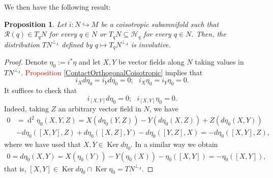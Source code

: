 \documentclass[12pt]{article}
\newtheorem{prop}{Proposition}[section]
\renewcommand{\ker}{\operatorname{Ker}}
\renewcommand{\d}{\operatorname{d}}
\begin{document}
We then have the following result:\\
\begin{prop} Let $i: N \hookrightarrow M$ be a coisotropic subamnifold such that $\mathcal{R}(q) \in T_qN$ for every $q \in N$ or $T_qN \subseteq \mathcal{H}_q$ for every $q \in N$. Then, the distribution $TN^{\perp_\Lambda}$ defined by $q \mapsto T_qN^{\perp_\Lambda}$ is involutive.
 \end{prop}
\begin{proof} Denote $\eta_0:= i^*\eta$ and let $X, Y$ be vector fields along $N$ taking values in $TN^{\perp_\Lambda}$. \textcolor{red}{Proposition \ref{ContactOrthogonalCoisotropic}} implies that $$i_X  d\eta_0 = i_Y d\eta_0 = 0;\,\,\,\, i_X \eta_0 = i_Y \eta_0 = 0.$$
It suffices to check that $$i_{[X,Y]} d\eta_0 = 0;\,\,\,\, i_{[X,Y]}\eta_0 =0.$$ Indeed, taking $Z$ an arbitrary vector field in $N$, we have
\begin{align*}
0 &= \d^2\eta_0(X,Y,Z) =  X( d\eta_0(Y,Z)) - Y( d\eta_0(X,Z)) + Z( d\eta_0(X,Y))\\
&-  d\eta_0([X,Y],Z) +  d\eta_0([X,Z],Y) - d\eta_0([Y,Z], X) = -d\eta_0([X,Y],Z),
\end{align*}
where we have used that $X,Y \in \ker d \eta_0.$ In a similar way we obtain 
\begin{align*}
0 = d\eta_0(X,Y) = X(\eta_0(Y)) - Y(\eta_0(X)) - \eta_0([X,Y]) = -\eta_0([X,Y]),
\end{align*}
that is, $[X,Y] \in \ker  d\eta_0 \cap \ker \eta_0 = TN^{\perp_\Lambda}.$
\end{proof}
\end{document}
